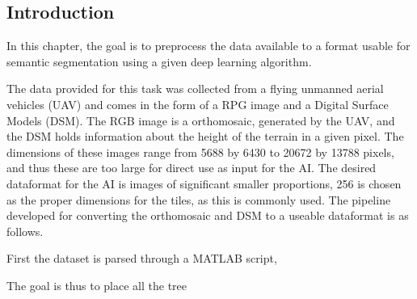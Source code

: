\documentclass[../../../main.tex]{subfiles}
\begin{document}
\subsection{Introduction}
\label{sec:datapp_introduction}

In this chapter, the goal is to preprocess the data available to a format usable for 
semantic segmentation using a given deep learning algorithm.

The data provided for this task was collected from a flying unmanned aerial vehicles (UAV) and comes in the form
of a RPG image and a Digital Surface Models (DSM). The RGB image is a orthomosaic, generated by the UAV, and the DSM holds information 
about the height of the terrain in a given pixel. The dimensions of these images range from 5688 by 6430 to 20672 by 13788 pixels,
and thus these are too large for direct use as input for the AI.  
The desired dataformat for the AI is images of significant smaller proportions, 256 is chosen as the proper dimensions for the tiles,
as this is commonly used.
The pipeline developed for converting the orthomosaic and DSM to a useable dataformat is as follows.

First the dataset is parsed through a MATLAB script,


The goal is thus to place all the tree 

\end{document}
